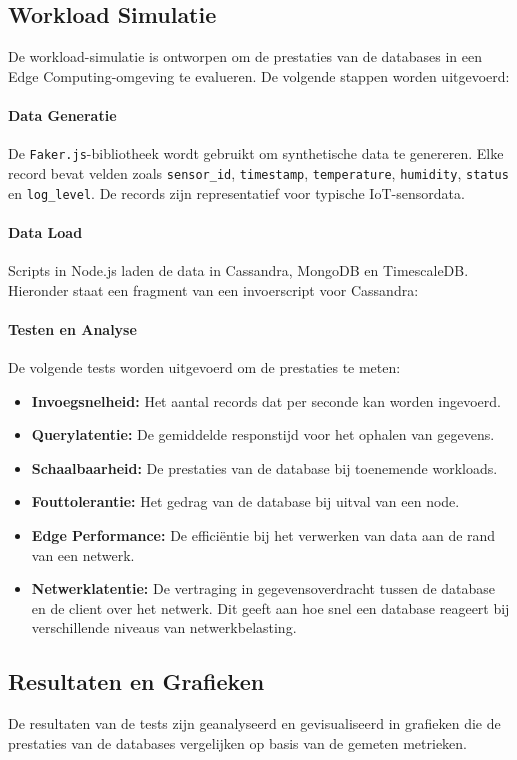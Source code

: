 \subsection{Workload Simulatie}
De workload-simulatie is ontworpen om de prestaties van de databases in een Edge Computing-omgeving te evalueren. De volgende stappen worden uitgevoerd:

\paragraph{Data Generatie}
De \texttt{Faker.js}-bibliotheek wordt gebruikt om synthetische data te genereren. Elke record bevat velden zoals \texttt{sensor\_id}, \texttt{timestamp}, \texttt{temperature}, \texttt{humidity}, \texttt{status} en \texttt{log\_level}. De records zijn representatief voor typische IoT-sensordata.

\paragraph{Data Load}
Scripts in Node.js laden de data in Cassandra, MongoDB en TimescaleDB. Hieronder staat een fragment van een invoerscript voor Cassandra:

\paragraph{Testen en Analyse}
De volgende tests worden uitgevoerd om de prestaties te meten:
\begin{itemize}
	\item \textbf{Invoegsnelheid:} Het aantal records dat per seconde kan worden ingevoerd.
	\item \textbf{Querylatentie:} De gemiddelde responstijd voor het ophalen van gegevens.
	\item \textbf{Schaalbaarheid:} De prestaties van de database bij toenemende workloads.
	\item \textbf{Fouttolerantie:} Het gedrag van de database bij uitval van een node.
	\item \textbf{Edge Performance:} De efficiëntie bij het verwerken van data aan de rand van een netwerk.
	\item \textbf{Netwerklatentie:} De vertraging in gegevensoverdracht tussen de database en de client over het netwerk. Dit geeft aan hoe snel een database reageert bij verschillende niveaus van netwerkbelasting.
\end{itemize}

\subsection{Resultaten en Grafieken}
De resultaten van de tests zijn geanalyseerd en gevisualiseerd in grafieken die de prestaties van de databases vergelijken op basis van de gemeten metrieken.

